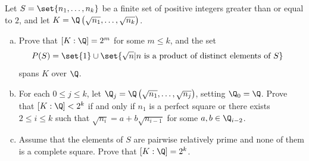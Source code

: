\documentclass[10pt]{mypackage}
\begin{document}
\begin{problem}[Problem 4]
  Let $S = \set{n_1,\dots,n_k}$ be a finite set of positive integers greater than or equal to $2$, and let $K = \Q\left( \sqrt{n_1},\dots,\sqrt{n_k} \right)$.
  \begin{enumerate}[(a)]
    \item Prove that $\left[ K:\Q \right] = 2^{m}$ for some $m\leq k$, and the set 
      \begin{align*}
        P(S) &= \set{1}\cup\set{\sqrt{n} | n\text{ is a product of distinct elements of }S}
      \end{align*}
      spans $K$ over $\Q$.
    \item For each $0\leq j \leq k$, let $\Q_j = \Q\left( \sqrt{n_1},\dots,\sqrt{n_j} \right)$, setting $\Q_0 = \Q$. Prove that $\left[ K:\Q \right] < 2^{k}$ if and only if $n_1$ is a perfect square or there exists $2\leq i \leq k$ such that $\sqrt{n_i} = a + b\sqrt{n_{i-1}}$ for some $a,b\in \Q_{i-2}$.
    \item Assume that the elements of $S$ are pairwise relatively prime and none of them is a complete square. Prove that $\left[ K:\Q \right] = 2^{k}$.
  \end{enumerate}
\end{problem}
\end{document}
